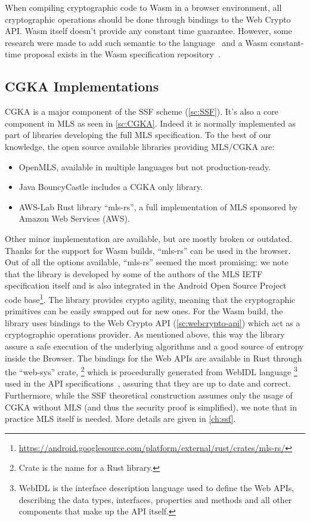 When compiling cryptographic code to Wasm in a browser environment,
all cryptographic operations should be done through bindings to
the Web Crypto API. Wasm itself doesn't provide any constant time
guarantee. However, some research were made to add such semantic
to the language~\cite{CTWasm, gu2023constanttimewasmtimerealtime}
and a Wasm constant-time proposal exists in the Wasm specification
repository~\cite{WasmCTProposal}.

\subsection{CGKA Implementations}\label{sc:CGKA-implementations}

CGKA is a major component of the SSF scheme (\cref{sc:SSF}).
It's also a core component in MLS as seen in \cref{sc:CGKA}.
Indeed it is normally implemented as part of libraries developing
the full MLS specification.
To the best of our knowledge, the open source available libraries
providing MLS/CGKA are:
\begin{itemize}
    \item OpenMLS, available in multiple languages but not production-ready.
    \item Java BouncyCastle includes a CGKA only library.
    \item AWS-Lab Rust library ``mls-rs'', a full implementation of MLS sponsored by Amazon Web Services (AWS). 
\end{itemize}

Other minor implementation are available, but are mostly broken or outdated.
Thanks for the support for Wasm builds, ``mls-rs'' can be used in the browser.
Out of all the options available, ``mls-rs'' seemed the most promising:
we note that the library is developed by some of the authors of the MLS IETF
specification itself and is also integrated in the Android Open Source Project
code base\footnote{\url{https://android.googlesource.com/platform/external/rust/crates/mls-rs/}}.
The library provides crypto agility, meaning that the cryptographic
primitives can be easily swapped out for new ones.
For the Wasm build, the library uses bindings to the Web Crypto API 
(\cref{sc:webcrypto-api}) which act as a cryptographic operations provider.
As mentioned above, this way the library assure a safe execution of the underlying
algorithms and a good source of entropy inside the Browser. 
The bindings for the Web APIs are available in Rust 
through the ``web-sys'' crate,
\footnote{Crate is the name for a Rust library.}
which is procedurally generated from WebIDL language
\footnote{WebIDL is the interface description language used to define the Web APIs, describing the data types, interfaces, properties and methods and all other components that make up the API itself.} 
used in the API specifications~\cite{WebSys}, assuring
that they are up to date and correct.
Furthermore, while the SSF theoretical construction
assumes only the usage of CGKA without MLS (and thus the security proof
is simplified), we note that in practice MLS itself is needed.
More details are given in \cref{ch:ssf}.

